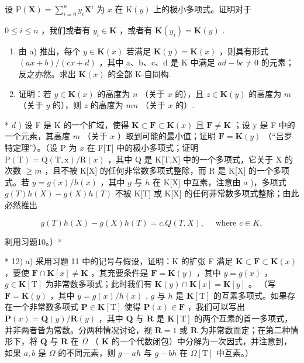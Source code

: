 设 \(\mathrm{P}(\mathbf{X}) = \sum_{i=0}^{n} y_i \mathbf{X}^i\) 为 \(x\) 在 \(\mathrm{K}(y)\) 上的极小多项式。证明对于

\(0 \leqslant i \leqslant n\) ，我们或者有 \(y_i \in \mathbf{K}\) ，或者有 \(\mathbf{K}(y_i) = \mathbf{K}(y)\) .

\begin{enumerate}
\def\labelenumi{\alph{enumi})}
\setcounter{enumi}{1}
\item
  由 a) 推出，每个 \(y \in \mathbf{K}(x)\) 若满足 \(\mathbf{K}(y) = \mathbf{K}(x)\) ，则具有形式 \((ax + b)/(cx + d)\) ，其中 a、b、c、d 是 K 中满足 \(ad - bc \neq 0\) 的元素；反之亦然。求出 \(\mathbf{K}(x)\) 的全部 K-自同构.
\item
  证明：若 \(y \in \mathbf{K}(x)\) 的高度为 \(n\) （关于 \(x\) 的），且 \(z \in \mathbf{K}(y)\) 的高度为 \(m\) （关于 \(y\) 的），则 \(z\) 的高度为 \(mn\) （关于 \(x\) 的）.
\end{enumerate}

* \(d\) ) 设 F 是 K 的一个扩域，使得 \(\mathbf{K} \subset \mathbf{F} \subset \mathbf{K}(x)\) 且 \(\mathbf{F} \neq \mathbf{K}\) ；设 y 是 F 中的一个元素，其高度 \(m\) （关于 \(x\) ）取到可能的最小值；证明 \(\mathbf{F} = \mathbf{K}(y)\) （“吕罗特定理”）。（设 P 为 \(x\) 在 F{[}T{]} 中的极小多项式；证明 \(\mathrm{P(T)} = \mathrm{Q(T,x)}/\mathrm{R}(x)\) ，其中 Q 是 K{[}T,X{]} 中的一个多项式，它关于 X 的次数 \(\geqslant m\) ，且不被 K{[}X{]} 的任何非常数多项式整除，而 R 是 K{[}X{]} 的一个多项式。若 \(y = g(x)/h(x)\) ，其中 \(g\) 与 \(h\) 在 K{[}X{]} 中互素，注意由 \(a\) )，多项式 \(g(T)h(X) - g(X)h(T)\) 不被 K{[}T{]} 或 K{[}X{]} 的任何非常数多项式整除；由此必然推出

\[
g (T) h (X) - g (X) h (T) = c. Q (T, X), \quad \text { where } c \in K,
\]

利用习题10。）*

* 12) a) 采用习题 11 中的记号与假设，证明：K 的扩张 F 满足 \(\mathbf{K} \subset \mathbf{F} \subset \mathbf{K}(x)\) ，要使 \(\mathbf{F} \cap \mathbf{K}[x] \neq \mathbf{K}\) ，其充要条件是 \(\mathbf{F} = \mathbf{K}(y)\) ，其中 \(y = g(x)\) ，\(g \in \mathbf{K}[\mathrm{T}]\) 为非常数多项式；此时我们有 \(\mathbf{K}(y) \cap \mathbf{K}[x] = \mathbf{K}[y]\) 。 （写 \(\mathbf{F} = \mathbf{K}(y)\) ，其中 \(y = g(x)/h(x)\) , \(g\) 与 \(h\) 是 \(\mathbf{K}[\mathrm{T}]\) 的互素多项式。如果存在一个非常数多项式 \(\mathbf{P} \in \mathbf{K}[\mathrm{T}]\) 使得 \(\mathbf{P}(x) \in \mathbf{F}\) ，我们可以写出 \(\mathbf{P}(x) = \mathbf{Q}(y)/\mathbf{R}(y)\) ，其中 \(\mathbf{Q}\) 与 \(\mathbf{R}\) 是 \(\mathbf{K}[\mathrm{T}]\) 的两个互素的首一多项式，并非两者皆为常数。分两种情况讨论，视 \(\mathbf{R} = 1\) 或 \(\mathbf{R}\) 为非常数而定；在第二种情形下，将 \(\mathbf{Q}\) 与 \(\mathbf{R}\) 在 \(\Omega\) （ \(\mathbf{K}\) 的一个代数闭包）中分解为一次因式，并注意到，如果 \(a, b\) 是 \(\Omega\) 的不同元素，则 \(g - ah\) 与 \(g - bh\) 在 \(\Omega[\mathrm{T}]\) 中互素。）

